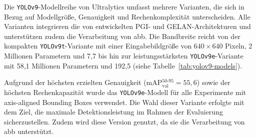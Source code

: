 Die \texttt{YOLOv9}-Modellreihe von Ultralytics umfasst mehrere Varianten, die sich in Bezug auf Modellgröße, Genauigkeit und Rechenkomplexität unterscheiden. Alle Varianten integrieren die von \citeauthor{wang2024_sapkota} entwickelten \acrshort{PGI}- und \acrshort{GELAN}-Architekturen und unterstützen zudem die Verarbeitung von \acrshort{abb}. Die Bandbreite reicht von der kompakten \texttt{YOLOv9t}-Variante mit einer Eingabebildgröße von $640 \times 640$ Pixeln, 2 Millionen Parametern und 7{,}7  bis hin zur leistungsstärksten \texttt{YOLOv9e}-Variante mit 58{,}1 Millionen Parametern und 192{,}5  (siehe Tabelle~\ref{tab:yolov9-models}).  

Aufgrund der höchsten erzielten Genauigkeit (\acrshort{mAP}$_{\text{val}}^{50\text{-}95} = 55,6$) sowie der höchsten Rechenkapazität wurde das \texttt{YOLOv9e}-Modell für alle Experimente mit axis-aligned Bounding Boxes verwendet. Die Wahl dieser Variante erfolgte mit dem Ziel, die maximale Detektionsleistung im Rahmen der Evaluierung sicherzustellen. Zudem wird diese Version genutzt, da sie die Verarbeitung von \acrlong{abb} unterstützt.



